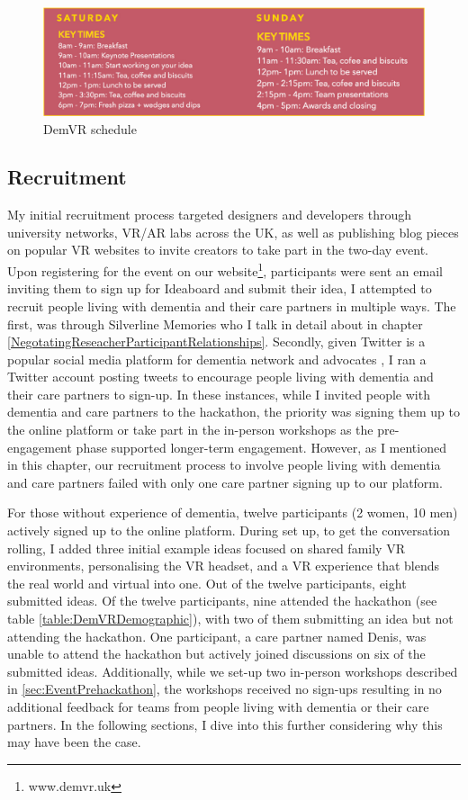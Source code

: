 \begin{figure}
\centering
\includegraphics[width=.8\linewidth]{Images/DemVRHackathonSchedule.jpg}
\caption{DemVR schedule}
\label{fig:schedule}
\end{figure}

\subsection{Recruitment}
\label{sec:EventRecruitment}
My initial recruitment process targeted designers and developers through university networks, VR/AR labs across the UK, as well as publishing blog pieces on popular VR websites to invite creators to take part in the two-day event. Upon registering for the event on our website\footnote{www.demvr.uk}, participants were sent an email inviting them to sign up for Ideaboard and submit their idea, I attempted to recruit people living with dementia and their care partners in multiple ways. The first, was through Silverline Memories who I talk in detail about in chapter \ref{NegotatingReseacherParticipantRelationships}. Secondly, given Twitter is a popular social media platform for dementia network and advocates \citep{talbot_how_2020}, I ran a Twitter account posting tweets to encourage people living with dementia and their care partners to sign-up. In these instances, while I invited people with dementia and care partners to the hackathon, the priority was signing them up to the online platform or take part in the in-person workshops as the pre-engagement phase supported longer-term engagement. However, as I mentioned in this chapter, our recruitment process to involve people living with dementia and care partners failed with only one care partner signing up to our platform.

For those without experience of dementia, twelve participants (2 women, 10 men) actively signed up to the online platform. During set up, to get the conversation rolling, I added three initial example ideas focused on shared family VR environments, personalising the VR headset, and a VR experience that blends the real world and virtual into one. Out of the twelve participants, eight submitted ideas. Of the twelve participants, nine attended the hackathon (see table \ref{table:DemVRDemographic}), with two of them submitting an idea but not attending the hackathon. One participant, a care partner named Denis, was unable to attend the hackathon but actively joined discussions on six of the submitted ideas. Additionally, while we set-up two in-person workshops described in \ref{sec:EventPrehackathon}, the workshops received no sign-ups resulting in no additional feedback for teams from people living with dementia or their care partners. In the following sections, I dive into this further considering why this may have been the case. 

